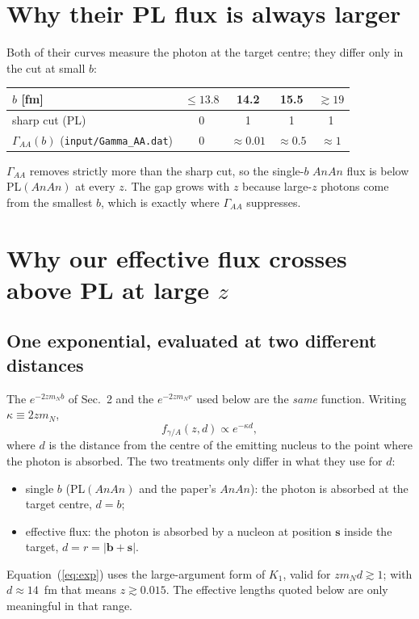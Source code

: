 \documentclass[11pt]{article}
\begin{document}
\section{Why their PL flux is always larger}

Both of their curves measure the photon at the target centre; they differ
only in the cut at small $b$:
\begin{center}
\begin{tabular}{lcccc}
\toprule
$b$ [fm] & $\le 13.8$ & 14.2 & 15.5 & $\gtrsim 19$ \\
\midrule
sharp cut (PL) & 0 & 1 & 1 & 1 \\
$\Gamma_{AA}(b)$ (\texttt{input/Gamma\_AA.dat}) & 0 & $\approx0.01$ & $\approx0.5$ & $\approx1$ \\
\bottomrule
\end{tabular}
\end{center}
$\Gamma_{AA}$ removes strictly more than the sharp cut, so the single-$b$
$AnAn$ flux is below PL$(AnAn)$ at every $z$. The gap grows with $z$ because
large-$z$ photons come from the smallest $b$, which is exactly where
$\Gamma_{AA}$ suppresses.

\section{Why our effective flux crosses above PL at large $z$}

\subsection{One exponential, evaluated at two different distances}

The $e^{-2zm_N b}$ of Sec.~2 and the $e^{-2zm_N r}$ used below are the
\emph{same} function. Writing $\kappa \equiv 2 z m_N$,
\begin{equation}
  f_{\gamma/A}(z,d) \propto e^{-\kappa d},
  \label{eq:exp}
\end{equation}
where $d$ is the distance from the centre of the emitting nucleus to the
point where the photon is absorbed. The two treatments only differ in what
they use for $d$:
\begin{itemize}
  \item single $b$ (PL$(AnAn)$ and the paper's $AnAn$): the photon is
    absorbed at the target centre, $d=b$;
  \item effective flux: the photon is absorbed by a nucleon at position
    $\mathbf s$ inside the target, $d=r=|\mathbf b+\mathbf s|$.
\end{itemize}
Equation~(\ref{eq:exp}) uses the large-argument form of $K_1$, valid for
$z m_N d \gtrsim 1$; with $d\approx14$~fm that means $z\gtrsim0.015$. The
effective lengths quoted below are only meaningful in that range.
\end{document}
